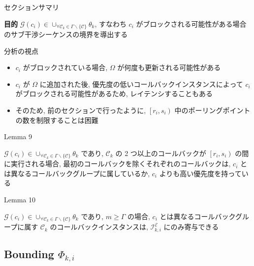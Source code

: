\begin{frame}{セクションサマリ}
    \begin{itembox}[l]{\textbf{目的}}
        $\mathcal{G}\left(c_{i}\right) \in \cup_{\forall \mathcal{C}_{k} \in \Gamma \backslash\{\mathcal{C}\}} \theta_{k}$, すなわち $c_{i}$ がブロックされる可能性がある場合のサブ干渉シーケンスの境界を導出する
    \end{itembox}
\end{frame}

\begin{frame}{分析の視点}
    \begin{itemize}
        \item $c_{i}$ がブロックされている場合, $\Omega$ が何度も更新される可能性がある
        \item $c_{i}$ が $\Omega$ に追加された後, 優先度の低いコールバックインスタンスによって $c_{i}$ がブロックされる可能性があるため, レイテンシすることもある
        \item そのため, 前のセクションで行ったように, $\left[r_{i}, s_{i}\right)$ 中のポーリングポイントの数を制限することは困難
    \end{itemize}
\end{frame}

\begin{frame}[label=lemma9]{Lemma 9}
    \begin{lemma}[]
        $\mathcal{G}\left(c_{i}\right) \in \cup_{\forall \mathcal{C}_{k} \in \Gamma \backslash\{\mathcal{C}\}} \theta_{k}$ であり, $\mathcal{C}_{k}$ の 2 つ以上のコールバックが $\left[r_{i}, s_{i}\right)$ の間に実行される場合, 最初のコールバックを除くそれぞれのコールバックは, $c_{i}$ とは異なるコールバックグループに属しているか, $c_{i}$ よりも高い優先度を持っている
    \end{lemma}
\end{frame}

\begin{frame}[label=lemma10]{Lemma 10}
    \begin{lemma}[]
        $\mathcal{G}\left(c_{i}\right) \in \cup_{\forall \mathcal{C}_{k} \in \Gamma \backslash\{\mathcal{C}\}} \theta_{k}$ であり, $m \geq \Gamma$ の場合, $c_{i}$ とは異なるコールバックグループに属す $\mathcal{C}_{k}$ のコールバックインスタンスは, $\mathcal{I}_{k, i}^{\mathcal{E}}$ にのみ寄与できる
    \end{lemma}
\end{frame}


\subsection{Bounding $\Phi_{k, i}$}
\label{ssec: bounding_phi}

